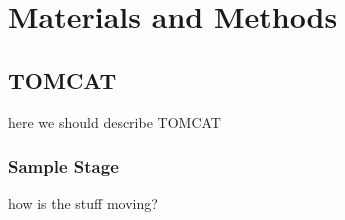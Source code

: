 \section{Materials and Methods}
\subsection{TOMCAT}
here we should describe TOMCAT
\subsubsection{Sample Stage}
how is the stuff moving?
